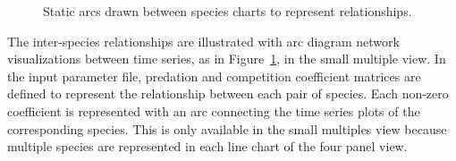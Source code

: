 \begin{figure}
\centering




	\caption{Static arcs drawn between species charts to represent relationships.}
	\label{fig:betweenSpeciesArcs}
\end{figure}

The inter-species relationships are illustrated with arc diagram network visualizations between time series, as in Figure~\ref{fig:betweenSpeciesArcs}, in the small multiple view.  In the input parameter file, predation and competition coefficient matrices are defined to represent the relationship between each pair of species.  Each non-zero coefficient is represented with an arc connecting the time series plots of the corresponding species.  This is only available in the small multiples view because multiple species are represented in each line chart of the four panel view.

